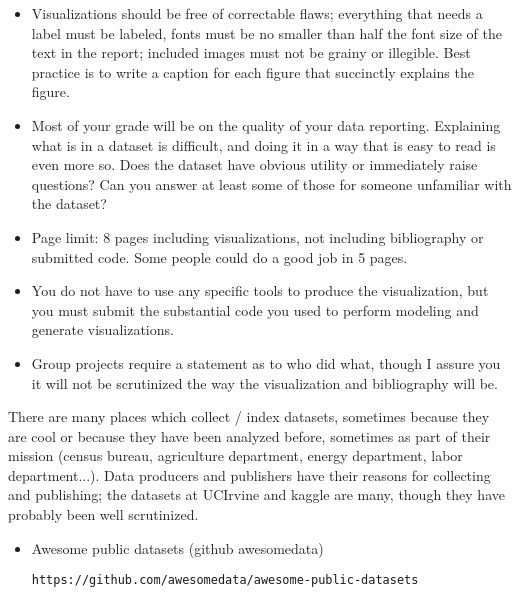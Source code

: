 \documentclass[]{book}
\theoremstyle{definition}
\begin{document}
\begin{enumerate}
\begin{itemize}
\item Visualizations should be free of correctable flaws; everything that needs a label must be labeled, fonts must be no smaller than half the font size of the text in the report; included images must not be grainy or illegible.  Best practice is to write a caption for each figure that succinctly explains the figure.

\item Most of your grade will be on the quality of your data reporting. Explaining what is in a dataset is difficult, and doing it in a way that is easy to read is even more so.  Does the dataset have obvious utility or immediately raise questions?  Can you answer at least some of those for someone unfamiliar with the dataset?

\item Page limit: 8 pages including visualizations, not including bibliography or submitted code.  Some people could do a good job in 5 pages.

\item You do not have to use any specific tools to produce the visualization, but you must submit the substantial code you used to perform modeling and generate visualizations.  

\item Group projects require a statement as to who did what, though I assure you it will not be scrutinized the way the visualization and bibliography will be.  
\end{itemize}

There are many places which collect / index datasets, sometimes because they are cool or because they have been analyzed before, sometimes as part of their mission (census bureau, agriculture department, energy department, labor department...).  Data producers and publishers have their reasons for collecting and publishing; the datasets at UCIrvine and kaggle are many, though they have probably been well scrutinized.

\begin{itemize}

\item  Awesome public datasets (github awesomedata)

\texttt{https://github.com/awesomedata/awesome-public-datasets}



\end{itemize}
\end{enumerate}
\end{document}
